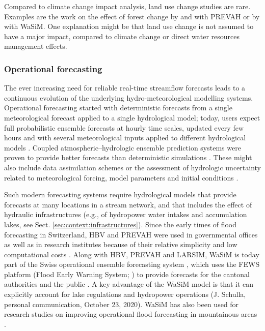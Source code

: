 \documentclass[10pt,a4paper]{article}
\begin{document}
Compared to climate change impact analysis, land use change studies are rare. Examples are the work on the effect of forest change by \citet{Koplin2013} and \citet{Schattan2013} with PREVAH or by \citet{Alaoui2014} with WaSiM. One explanation might be that land use change is not assumed to have a major impact, compared to climate change or direct water resources management effects. 


\subsubsection{Operational forecasting}
\label{sec:context:forecasting}

The ever increasing need for reliable real-time streamflow forecasts leads to a continuous evolution of the underlying hydro-meteorological modelling systems. Operational forecasting started with deterministic forecasts from a single meteorological forecast applied to a single hydrological model; today, users expect full probabilistic ensemble forecasts at hourly time scales, updated every few hours and with several meteorological inputs applied to different hydrological models \citep{Jasper2016}. Coupled atmospheric--hydrologic ensemble prediction systems were proven to provide better forecasts than deterministic simulations \citep{Verbunt2007, Zappa2008, Jaun2008, Liechti2013}. These might also include data assimilation schemes \citep{JorgHess2015a} or the assessment of hydrologic uncertainty related to meteorological forcing, model parameters and initial conditions \citep{Jaun2009, Zappa2011a, Fundel2011}.

Such modern forecasting systems require hydrological models that provide forecasts at many locations in a stream network, and that includes the effect of hydraulic infrastructures (e.g., of hydropower water intakes and accumulation lakes, see Sect. \ref{sec:context:infrastructures}). Since the early times of flood forecasting in Switzerland, HBV and PREVAH were used in governmental offices \citep{Jasper2016} as well as in research institutes because of their relative simplicity and low computational costs \citep{Verbunt2006, Addor2011, Murphy2019, Antonetti2019}. Along with HBV, PREVAH and LARSIM, WaSiM is today part of the Swiss operational ensemble forecasting system \citep{Jasper2016}, which uses the FEWS platform (Flood Early Warning System; \citealp{Werner2013}) to provide forecasts for the cantonal authorities and the public \citep{FOEN2019}. A key advantage of the WaSiM model is that it can explicitly account for lake regulations and hydropower operations (J. Schulla, personal communication, October 23, 2020). WaSiM has also been used for research studies on improving operational flood forecasting in mountainous areas \citep{Jasper2002, Jasper2003, Ahrens2003a, Ahrens2003b}.
\end{document}
